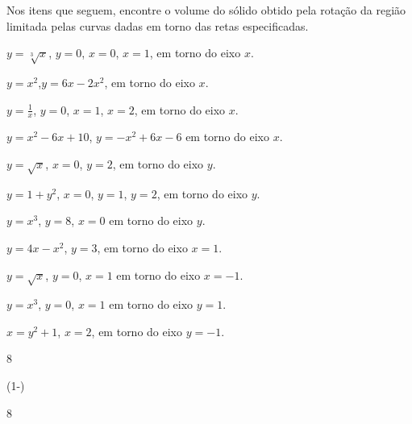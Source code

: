 \begin{exercises}

\begin{exercise}
  Nos itens que seguem, encontre o volume do sólido obtido pela rotação
  da região limitada pelas curvas dadas em torno das retas especificadas.
\begin{alphalist}
  \item $y=\sqrt[3]{x}$, $y=0$, $x=0$, $x=1$, em torno do eixo $x$.
  \item $y=x^2$,$y=6x-2x^2$, em torno do eixo $x$.
  \item $y=\frac{1}{x}$, $y=0$, $x=1$, $x=2$, em torno do eixo $x$.
  \item $y=x^2-6x+10$, $y=-x^2+6x-6$ em torno do eixo $x$.
  \item $y=\sqrt{x}$, $x=0$, $y=2$,  em torno do eixo $y$.
  \item $y=1+y^2$, $x=0$, $y=1$, $y=2$, em torno do eixo $y$.
  \item $y=x^3$, $y=8$, $x=0$ em torno do eixo $y$.
  \item $y=4x-x^2$, $y=3$, em torno do eixo $x=1$.
  \item $y=\sqrt{x}$, $y=0$, $x=1$ em torno do eixo $x=-1$.
  \item $y=x^3$, $y=0$, $x=1$ em torno do eixo $y=1$.
  \item $x=y^2+1$, $x=2$,  em torno do eixo $y=-1$.
\end{alphalist}
\begin{answer}
\begin{mathlist}[3]
  \item {}
  \item 8\pi
  \item \pi\left(1-\right)
  \item {}
  \item 8\pi
  \item {}
  \item {}
  \item {}
  \item {}
  \item {}
  \item {}
\end{mathlist}
\end{answer}
\end{exercise}


\end{exercises}
